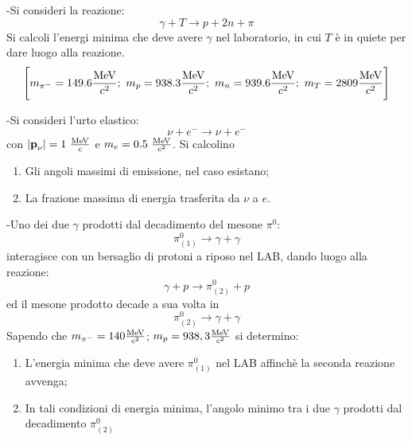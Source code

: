 \documentclass[12pt,twoside,a4]{article}
\begin{document}
\begin{esercizio}
	-Si consideri la reazione:
	\begin{equation*}
		\gamma + T \rightarrow p + 2n + \pi
	\end{equation*}
	Si calcoli l'energi minima che deve avere $\gamma$ nel laboratorio, in cui $T$ è in quiete per dare luogo alla reazione.
	\begin{equation*} 
		\Bigg[ m_{\pi^-}= 149.6 \frac{\mathrm{MeV}}{c^2}; \ m_p= 938.3 \frac{\mathrm{MeV}}{c^2}; \ m_n = 939.6 \frac{\mathrm{MeV}}{c^2}; \ m_T=2809 \frac{\mathrm{MeV}}{c^2} \Bigg]
	\end{equation*}
\end{esercizio}

\begin{esercizio}
	-Si consideri l'urto elastico:
	\begin{equation*}
		\nu + e^- \rightarrow \nu + e^-
	\end{equation*}
	con $|\textbf p_\nu |=1 \ \frac{\mathrm{MeV}}{c}$ e $m_e=0.5 \ \frac{\mathrm{MeV}}{c^2}$. Si calcolino
	\begin{enumerate}[label=(\textit{\roman*})]
		\item Gli angoli massimi di emissione, nel caso esistano;
		\item La frazione massima di energia trasferita da $\nu$ a $e$.
	\end{enumerate}
\end{esercizio}

\begin{esercizio}
	-Uno dei due $\gamma$ prodotti dal decadimento del mesone $\pi^0$:
	\begin{equation*}
		\pi^0_{(1)} \rightarrow \gamma + \gamma
	\end{equation*}
	interagisce con un bersaglio di protoni a riposo nel LAB, dando luogo alla reazione:
	\begin{equation*}
		\gamma + p \rightarrow \pi^0 _{(2)} + p
	\end{equation*}
	ed il mesone prodotto decade a sua volta in 
	\begin{equation*}
		\pi^0_{(2)} \rightarrow \gamma + \gamma
	\end{equation*}
	Sapendo che $m_{\pi^-}= 140 \frac{\mathrm{MeV}}{c^2}$; $m_p= 938,3 \frac{\mathrm{MeV}}{c^2}$ si determino:
	\begin{enumerate}[label=(\textit{\roman*})]
		\item L'energia minima che deve avere $\pi^0_{(1)}$ nel LAB affinchè la seconda reazione avvenga;
		\item In tali condizioni di energia minima, l'angolo minimo tra i due $\gamma$ prodotti dal decadimento $\pi^0_{(2)}$
	\end{enumerate}
\end{esercizio}
\end{document}
